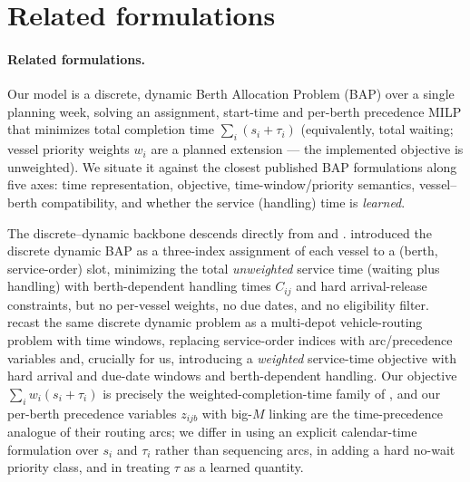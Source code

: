 \section{Related formulations}

\paragraph{Related formulations.}
Our model is a discrete, dynamic Berth Allocation Problem (BAP) over a single
planning week, solving an assignment, start-time and per-berth precedence MILP
that minimizes total completion time $\sum_i (s_i + \tau_i)$ (equivalently,
total waiting; vessel priority weights $w_i$ are a planned extension --- the
implemented objective is unweighted). We
situate it against the closest published BAP formulations along five axes: time
representation, objective, time-window/priority semantics, vessel--berth
compatibility, and whether the service (handling) time is \emph{learned}.

The discrete--dynamic backbone descends directly from \citet{imai2001dynamic}
and \citet{cordeau2005berth}. \citet{imai2001dynamic} introduced the discrete
dynamic BAP as a three-index assignment of each vessel to a (berth,
service-order) slot, minimizing the total \emph{unweighted} service time
(waiting plus handling) with berth-dependent handling times $C_{ij}$ and hard
arrival-release constraints, but no per-vessel weights, no due dates, and no
eligibility filter. \citet{cordeau2005berth} recast the same discrete dynamic
problem as a multi-depot vehicle-routing problem with time windows, replacing
service-order indices with arc/precedence variables and, crucially for us,
introducing a \emph{weighted} service-time objective with hard arrival and
due-date windows and berth-dependent handling. Our objective
$\sum_i w_i (s_i + \tau_i)$ is precisely the weighted-completion-time family of
\citet{cordeau2005berth}, and our per-berth precedence variables $z_{ijb}$ with
big-$M$ linking are the time-precedence analogue of their routing arcs; we
differ in using an explicit calendar-time formulation over $s_i$ and $\tau_i$
rather than sequencing arcs, in adding a hard no-wait priority class, and in
treating $\tau$ as a learned quantity.

